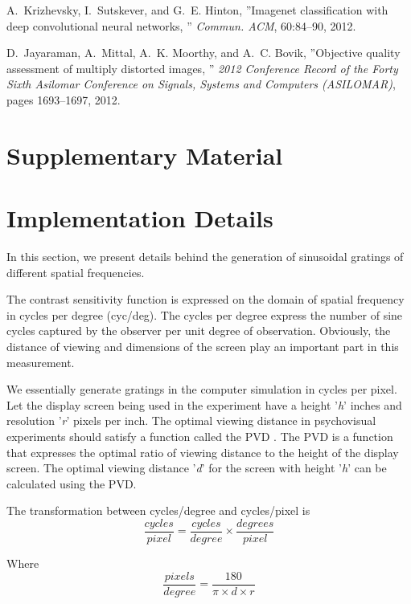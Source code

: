 \documentclass[10pt,twocolumn,letterpaper]{article}
\begin{document}
{\begin{thebibliography}{10}
A.~Krizhevsky, I.~Sutskever, and G.~E. Hinton, ''Imagenet classification with deep convolutional neural networks, '' \emph{Commun. ACM}, 60:84--90, 2012.

D.~Jayaraman, A.~Mittal, A.~K. Moorthy, and A.~C. Bovik, ''Objective quality assessment of multiply distorted images, '' \emph{2012 Conference Record of the Forty Sixth Asilomar Conference on
  Signals, Systems and Computers (ASILOMAR)}, pages 1693--1697, 2012.

\end{thebibliography}}

\appendix
\section{Supplementary Material}
\section{Implementation Details}
In this section, we present details behind the generation of sinusoidal gratings of different spatial frequencies.

The contrast sensitivity function is expressed on the domain of spatial frequency in cycles per degree (cyc/deg). The cycles per degree express the number of sine cycles captured by the observer per unit degree of observation. Obviously, the distance of viewing and dimensions of the screen play an important part in this measurement.

We essentially generate gratings in the computer simulation in cycles per pixel. Let the display screen being used in the experiment have a height '\textit{h}' inches and resolution '\textit{r}' pixels per inch. The optimal viewing distance in psychovisual experiments should satisfy a function called the PVD \cite{1}. The PVD is a function that expresses the optimal ratio of viewing distance to the height of the display screen. The optimal viewing distance '\textit{d}' for the screen with height '\textit{h}' can be calculated using the PVD.

The transformation between cycles/degree and cycles/pixel is
\begin{equation}
   \frac{cycles}{pixel} = \frac{cycles}{degree} \times \frac{degrees}{pixel}
\end{equation}

Where
\begin{equation}
   \frac{pixels}{degree} = \frac{180}{\pi \times d \times r}
\end{equation}
\end{document}
